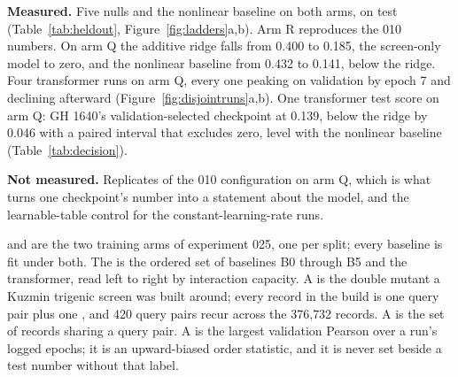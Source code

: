 \begin{keybox}
\textbf{Measured.} Five nulls and the nonlinear baseline on both arms, on test
(Table~\ref{tab:heldout}, Figure~\ref{fig:ladders}a,b). Arm R reproduces the 010
numbers. On arm Q the additive ridge falls from 0.400 to 0.185, the screen-only
model to zero, and the nonlinear baseline from 0.432 to 0.141, below the ridge.
Four transformer runs on arm Q, every one peaking on validation by epoch 7 and
declining afterward (Figure~\ref{fig:disjointruns}a,b). One transformer test score
on arm Q: GH 1640's validation-selected checkpoint at 0.139, below the ridge by
0.046 with a paired interval that excludes zero, level with the nonlinear baseline
(Table~\ref{tab:decision}).

\textbf{Not measured.} Replicates of the 010 configuration on arm Q, which is
what turns one checkpoint's number into a statement about the model, and the
learnable-table control for the constant-learning-rate runs.
\end{keybox}

 and  are the two training arms of experiment 025, one per
split; every baseline is fit under both. The  is the ordered set of
baselines B0 through B5 and the transformer, read left to right by interaction
capacity. A  is the double mutant a Kuzmin trigenic screen was
built around; every record in the build is one query pair plus one , and 420 query pairs recur across the 376{,}732 records. A  is
the set of records sharing a query pair. A  is the largest
validation Pearson over a run's logged epochs; it is an upward-biased order
statistic, and it is never set beside a test number without that label.
